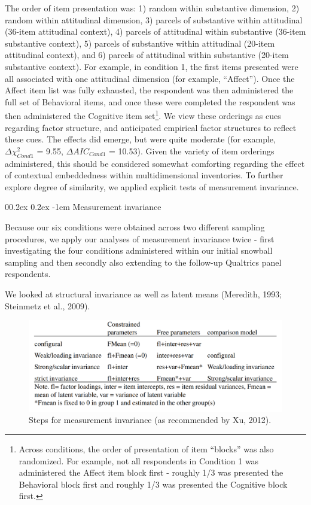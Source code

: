 \documentclass[
  man]{apa7}
\makeatletter
\let\oldparagraph\paragraph
\renewcommand{\paragraph}[1]{\oldparagraph{#1}\mbox{}}
\renewcommand{\paragraph}{\@startsection{paragraph}{4}{\parindent}%
  {0\baselineskip \@plus 0.2ex \@minus 0.2ex}%
  {-1em}%
  {\normalfont\normalsize\bfseries\itshape\typesectitle}}
\makeatother
\begin{document}
The order of item presentation was: 1) random within substantive dimension, 2) random within attitudinal dimension, 3) parcels of substantive within attitudinal (36-item attitudinal context), 4) parcels of attitudinal within substantive (36-item substantive context), 5) parcels of substantive within attitudinal (20-item attitudinal context), and 6) parcels of attitudinal within substantive (20-item substantive context). For example, in condition 1, the first items presented were all associated with one attitudinal dimension (for example, ``Affect''). Once the Affect item list was fully exhausted, the respondent was then administered the full set of Behavioral items, and once these were completed the respondent was then administered the Cognitive item set\footnote{Across conditions, the order of presentation of item ``blocks'' was also randomized. For example, not all respondents in Condition 1 was administered the Affect item block first - roughly 1/3 was presented the Behavioral block first and roughly 1/3 was presented the Cognitive block first.}. We view these orderings as cues regarding factor structure, and anticipated empirical factor structures to reflect these cues. The effects did emerge, but were quite moderate (for example, \(\Delta{\chi^2_{Cond1}}\) = 9.55, \(\Delta{AIC_{Cond1}}\) = 10.53). Given the variety of item orderings administered, this should be considered somewhat comforting regarding the effect of contextual embeddedness within multidimensional inventories. To further explore degree of similarity, we applied explicit tests of measurement invariance.

\hypertarget{measurement-invariance}{%
\paragraph{Measurement invariance}\label{measurement-invariance}}

Because our six conditions were obtained across two different sampling procedures, we apply our analyses of measurement invariance twice - first investigating the four conditions administered within our initial snowball sampling and then secondly also extending to the follow-up Qualtrics panel respondents.

We looked at structural invariance as well as latent means (Meredith, 1993; Steinmetz et al., 2009).

\begin{figure}
\includegraphics[width=4.71in]{steps} \caption{Steps for measurement invariance (as recommended by Xu, 2012).}\label{fig:figure1}
\end{figure}
\end{document}
